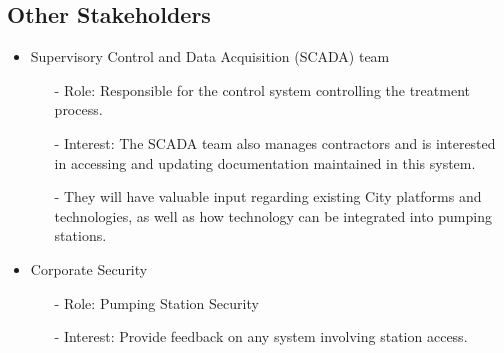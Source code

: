 \documentclass[12pt]{article}
\begin{document}
\subsection{Other Stakeholders}

\begin{itemize}
  \item Supervisory Control and Data Acquisition (SCADA) team
    \begin{itemize}
      \item[-] Role: Responsible for the control system controlling
        the treatment process.
      \item[-] Interest: The SCADA team also manages contractors and is
        interested in accessing and updating documentation maintained
        in this system.
      \item[-] They will have valuable input regarding existing City
        platforms and technologies, as well as how technology can be
        integrated into pumping stations.
    \end{itemize}
  \item Corporate Security

    \begin{itemize}
      \item[-] Role: Pumping Station Security
      \item[-] Interest: Provide feedback on any system involving station
        access.
    \end{itemize}
\end{itemize}
\end{document}
